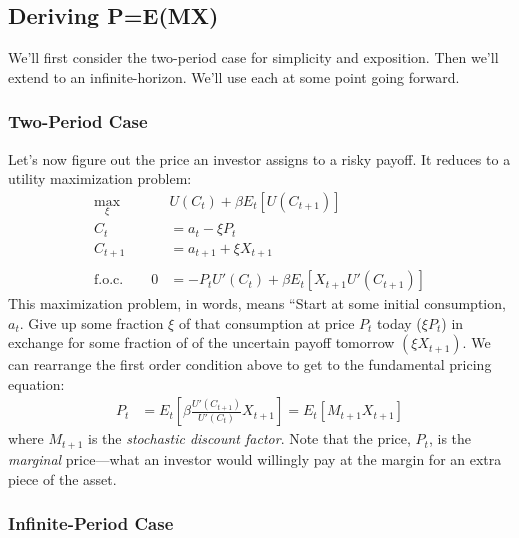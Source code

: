 \documentclass[a4paper,12pt]{scrartcl}
\begin{document}
\newpage
\subsection{Deriving P=E(MX)}

We'll first consider the two-period case for simplicity and
exposition. Then we'll extend to an infinite-horizon. We'll use 
each at some point going forward.

\subsubsection{Two-Period Case}

Let's now figure out the price an investor assigns to a risky
payoff.  It reduces to a utility maximization problem:
\begin{align*}
    \max_{\xi} \quad &U(C_t) + \beta E_t\left[U(C_{t+1})\right] \\
    C_t &= a_t - \xi P_t  \\
    C_{t+1} &= a_{t+1} + \xi X_{t+1} \\\\
    \text{f.o.c.} \qquad 
    0 &= -P_t U'(C_t) + \beta E_t\left[ X_{t+1} U'(C_{t+1})\right] 
\end{align*}
This maximization problem, in words, means ``Start
at some initial consumption, $a_t$. Give up some 
fraction $\xi$ of that consumption at price $P_t$ today 
($\xi P_t$) in exchange for some fraction of of the
uncertain payoff tomorrow $(\xi X_{t+1})$. We can 
rearrange the first order condition above to get to the
fundamental pricing equation:
\begin{align}
    P_t &= E_t\left[ 
	\beta\frac{U'(C_{t+1})}{U'(C_{t})} X_{t+1} \right]
    = E_t\left[ M_{t+1} X_{t+1} \right] 
	\label{fullpemx} 
\end{align}
where $M_{t+1}$ is the \emph{stochastic discount factor}.
Note that the price, $P_t$, is the \emph{marginal} price---what
an investor would willingly pay at the margin for
an extra piece of the asset.

\subsubsection{Infinite-Period Case}
\end{document}
